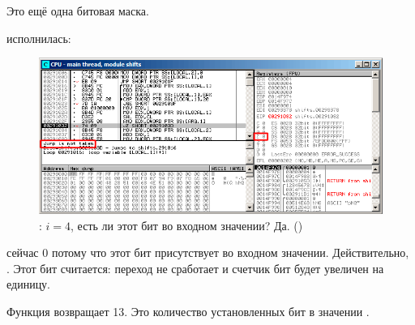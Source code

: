 Это ещё одна битовая маска.

\clearpage
\AND исполнилась:

\begin{figure}[H]
\centering
\includegraphics[scale=\FigScale]{patterns/14_bitfields/4_popcnt/olly4_3.png}
\caption{\olly: $i=4$, есть ли этот бит во входном значении? Да.  ()}
\label{fig:shifts_olly4_3}
\end{figure}

\ZF сейчас 0 потому что этот бит присутствует во входном значении.
Действительно, . 
Этот бит считается: переход не сработает и счетчик бит будет увеличен на единицу.

Функция возвращает 13. 
Это количество установленных бит в значении .
